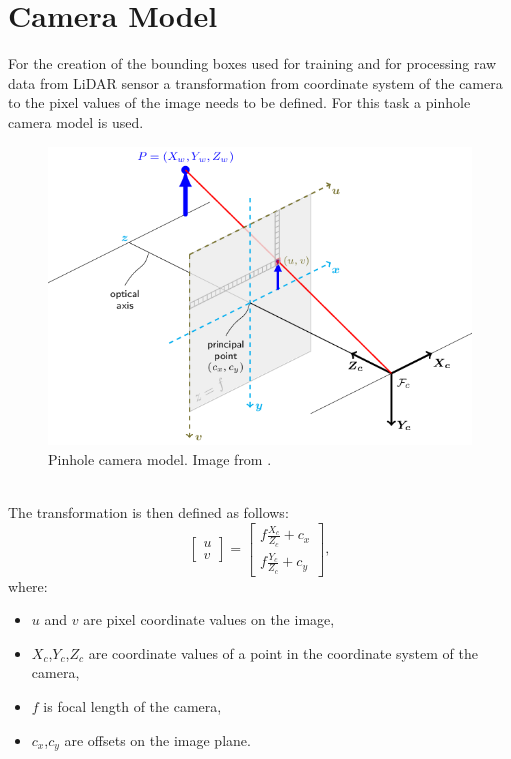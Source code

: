 \documentclass[twoside]{ctuthesis}
\theoremstyle{plain}
\theoremstyle{definition}
\theoremstyle{note}
\begin{document}
\section{Camera Model}
For the creation of the bounding boxes used for training and for processing raw data from LiDAR sensor a transformation from coordinate system of the camera to the pixel values of the image needs to be defined. For this task a pinhole camera model is used.
\begin{figure}[h]
	\centering
	\includegraphics[width=\textwidth]{pinhole_camera_model.png}
	\caption{Pinhole camera model. Image from \cite{opencv}.}
\end{figure}\\
The transformation is then defined as follows:
\begin{equation} \label{eq:2}
	\begin{bmatrix}
		u\\
		v
	\end{bmatrix}=
	\begin{bmatrix}
		f\frac{X_c}{Z_c}+c_x\\
		f\frac{Y_c}{Z_c}+c_y
	\end{bmatrix},
\end{equation}
where:
\begin{itemize}
	\item $u$ and $v$ are pixel coordinate values on the image,
	\item $X_c$,$Y_c$,$Z_c$ are coordinate values of a point in the coordinate system of the camera,
	\item $f$ is focal length of the camera,
	\item $c_x$,$c_y$ are offsets on the image plane.
\end{itemize}
\end{document}

